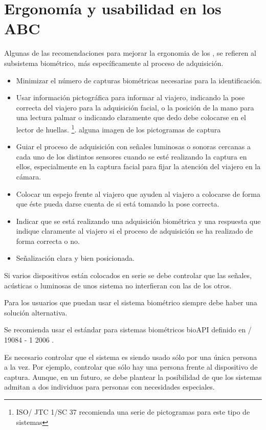 \section{Ergonomía y usabilidad en los ABC}\label{sec:ErgonomiaBiometricosABC}

Algunas de las recomendaciones para mejorar la \gls{ergonomia} de los , se refieren al subsistema biométrico, más específicamente al proceso de adquisición. 

\begin{itemize}
    \item
    Minimizar el número de capturas biométricas necesarias para la identificación. 
    \item
    Usar información pictográfica para informar al viajero, indicando la pose correcta del viajero para la adquisición facial, o la posición de la mano para una lectura palmar o indicando claramente que dedo debe colocarse en el lector de huellas. \footnote{\gls{ISO}/ JTC 1/SC 37 \cite{ISO/Biometric} recomienda una serie de pictogramas para este tipo de sistemas}.
    \color{red} alguna imagen de los pictogramas de captura\color{black}
    \item
    Guiar el proceso de adquisición con señales luminosas o sonoras cercanas a cada uno de los distintos sensores cuando se esté realizando la captura en ellos, especialmente en la captura facial para fijar la atención del viajero en la cámara.
    \item
    Colocar un espejo frente al viajero que ayuden al viajero a colocarse de forma que éste pueda darse cuenta de si está tomando la pose correcta. 
    \item
    Indicar que se está realizando una adquisición biométrica y una respuesta que indique claramente al viajero si el proceso de adquisición se ha realizado de forma correcta o no.
    \item
    Señalización clara y bien posicionada.

\end{itemize}

Si varios dispositivos están colocados en serie se debe controlar que las señales, acústicas o luminosas de unos sistema no interfieran con las de los otros.

Para los usuarios que puedan usar el sistema biométrico siempre debe haber una solución alternativa.

Se recomienda usar el estándar para sistemas biométricos bioAPI definido en / 19084 - 1 2006 \cite{ISO/BioApi}.

Es necesario controlar que el sistema es siendo usado sólo por una única persona a la vez. Por ejemplo, controlar que sólo hay una persona frente al dispositivo de captura. Aunque, en un futuro, se debe plantear la posibilidad de que los sistemas admitan a dos individuos para personas con necesidades especiales. 
